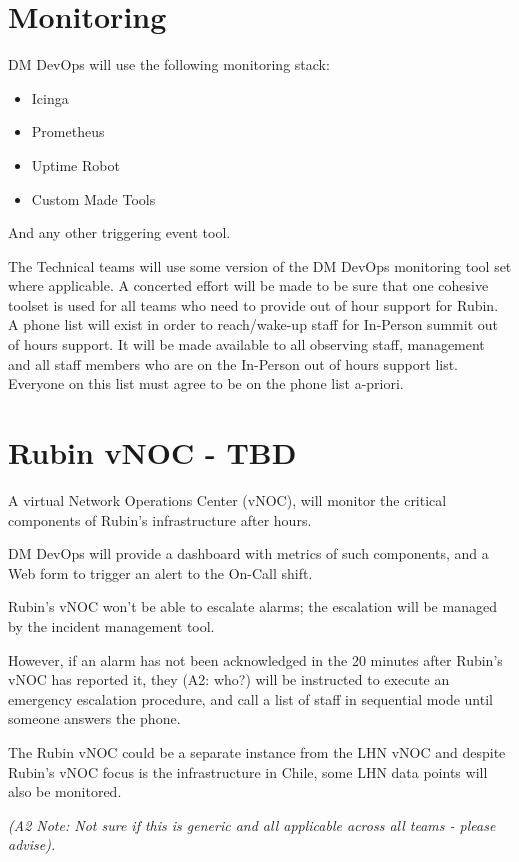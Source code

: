\section{Monitoring}

DM DevOps will use the following monitoring stack:

\begin{itemize}
    \item Icinga
    \item Prometheus
    \item Uptime Robot
    \item Custom Made Tools
\end{itemize}

And any other triggering event tool.

The Technical teams will use some version of the DM DevOps monitoring tool set where applicable.
A concerted effort will be made to be sure that one cohesive toolset is used for all teams who need to provide out of hour support for Rubin.
A phone list will exist in order to reach/wake-up staff for In-Person summit out of hours support.  It will be made available to all observing staff, management and all staff members who are on the In-Person out of hours support list.  Everyone on this list must agree to be on the phone list a-priori.

\section{Rubin vNOC - TBD}

A virtual Network Operations Center (vNOC), will monitor the critical components of Rubin's infrastructure after hours.

DM DevOps will provide a dashboard with metrics of such components, and a Web form to trigger an alert to the On-Call shift.

Rubin's vNOC won't be able to escalate alarms; the escalation will be managed by the incident management tool.

However, if an alarm has not been acknowledged in the 20 minutes after Rubin's vNOC has reported it, they (A2: who?) will be instructed to execute an emergency escalation procedure, and call a list of staff in sequential mode until someone answers the phone.

The Rubin vNOC could be a separate instance from the LHN vNOC and despite Rubin's vNOC focus is the infrastructure in Chile, some LHN data points will also be monitored.

\textit{
(A2 Note:  Not sure if this is generic and all applicable across all teams - please advise).}

